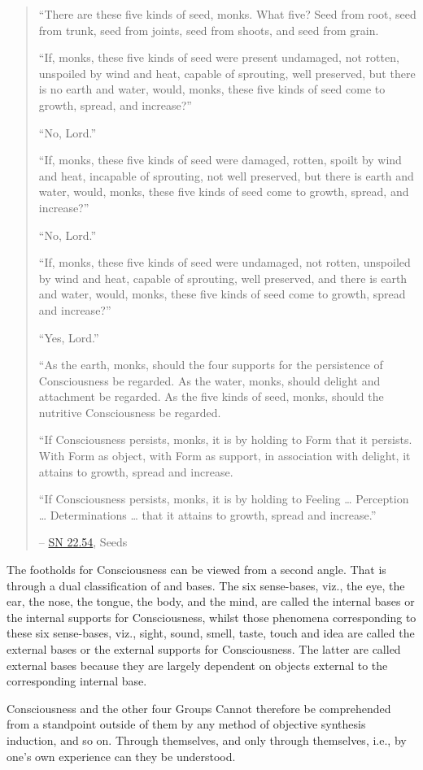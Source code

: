 \begin{quote}
``There are these five kinds of seed, monks. What five? Seed from root, seed from trunk, seed from joints, seed from shoots, and seed from grain.

``If, monks, these five kinds of seed were present undamaged, not rotten, unspoiled by wind and heat, capable of sprouting, well preserved, but there is no earth and water, would, monks, these five kinds of seed come to growth, spread, and increase?''

``No, Lord.''

``If, monks, these five kinds of seed were damaged, rotten, spoilt by wind and heat, incapable of sprouting, not well preserved, but there is earth and water, would, monks, these five kinds of seed come to growth, spread, and increase?''

``No, Lord.''

``If, monks, these five kinds of seed were undamaged, not rotten, unspoiled by wind and heat, capable of sprouting, well preserved, and there is earth and water, would, monks, these five kinds of seed come to growth, spread and increase?''

``Yes, Lord.''

``As the earth, monks, should the four supports for the persistence of Consciousness be regarded. As the water, monks, should delight and attachment be regarded. As the five kinds of seed, monks, should the nutritive Consciousness be regarded.

``If Consciousness persists, monks, it is by holding to Form that it persists. With Form as object, with Form as support, in association with delight, it attains to growth, spread and increase.

``If Consciousness persists, monks, it is by holding to Feeling \ldots{} Perception \ldots{} Determinations \ldots{} that it attains to growth, spread and increase.''

 -- \href{https://suttacentral.net/sn22.54/en/bodhi}{SN 22.54}, Seeds
\end{quote}

The footholds for Consciousness can be viewed from a second angle. That is through a dual classification of  and  bases. The six sense-bases, viz., the eye, the ear, the nose, the tongue, the body, and the mind, are called the internal bases or the internal supports for Consciousness, whilst those phenomena corresponding to these six sense-bases, viz., sight, sound, smell, taste, touch and idea are called the external bases or the external supports for Consciousness. The latter are called external bases because they are largely dependent on objects external to the corresponding internal base.

Consciousness and the other four Groups Cannot therefore be comprehended from a standpoint outside of them by any method of objective synthesis induction, and so on. Through themselves, and only through themselves, i.e., by one's own experience  can they be understood.
